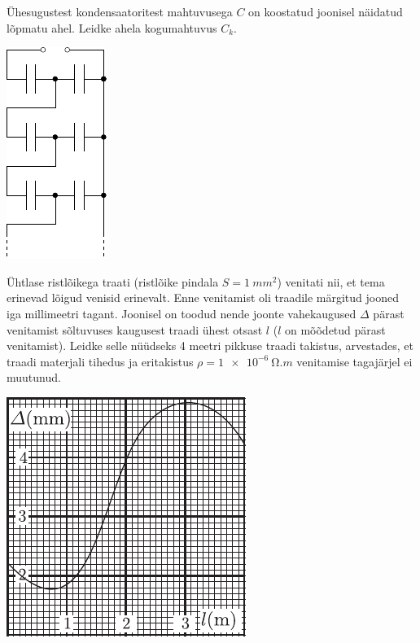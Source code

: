 \documentclass[10pt, twoside]{article}
\begin{document}
{%

Ühesugustest kondensaatoritest mahtuvusega $C$ on koostatud joonisel näidatud lõpmatu ahel. Leidke ahela kogumahtuvus $C_k$.

\begin{center}
	\includegraphics[width=0.3\linewidth]{2007-v2g-08-yl}
\end{center}
\probend
\bigskip


Ühtlase ristlõikega traati (ristlõike pindala $S = \SI{1}{mm^2}$) venitati nii, et tema erinevad lõigud venisid erinevalt. Enne venitamist oli traadile märgitud jooned iga millimeetri tagant. Joonisel on toodud nende joonte vahekaugused $\Delta$ pärast venitamist sõltuvuses kaugusest traadi ühest otsast $l$ ($l$ on mõõdetud pärast venitamist). Leidke selle nüüdseks 4 meetri pikkuse traadi takistus, arvestades, et traadi materjali tihedus ja eritakistus $\rho = \SI{1e-6}{\ohm.m}$ venitamise tagajärjel ei muutunud.

\begin{center}
	\includegraphics[width=0.6\linewidth]{2008-v3g-07-yl}
\end{center}
\probend
\bigskip

}
\end{document}
